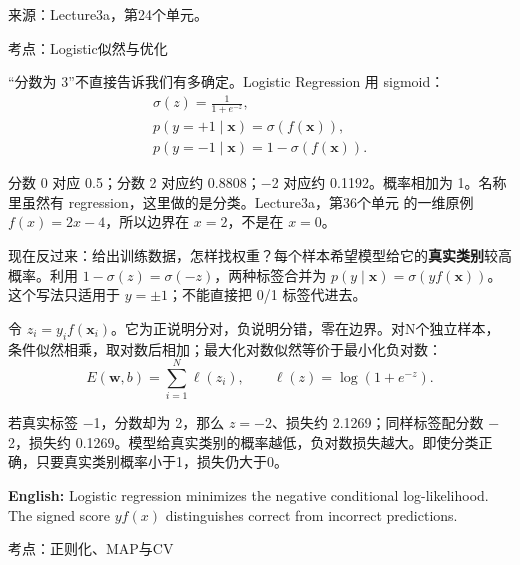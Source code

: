 来源：Lecture3a，第24个单元。








考点：Logistic似然与优化

“分数为 3”不直接告诉我们有多确定。Logistic Regression 用 sigmoid：
\[
\begin{gathered}\sigma(z)=\frac1{1+e^{-z}},\\[3pt]
p(y=+1\mid\mathbf x)=\sigma(f(\mathbf x)),\\
p(y=-1\mid\mathbf x)=1-\sigma(f(\mathbf x)).\end{gathered}\tag{3.2}
\]


分数 0 对应 0.5；分数 2 对应约 0.8808；\ensuremath{-}2 对应约 0.1192。概率相加为 1。名称里虽然有 regression，这里做的是分类。Lecture3a，第36个单元 的一维原例 \(f(x)=2x-4\)，所以边界在 \(x=2\)，不是在 \(x=0\)。


现在反过来：给出训练数据，怎样找权重？每个样本希望模型给它的\textbf{真实类别}较高概率。利用 \(1-\sigma(z)=\sigma(-z)\)，两种标签合并为 \(p(y\mid\mathbf x)=\sigma(yf(\mathbf x))\)。这个写法只适用于 \(y=\pm1\)；不能直接把 0/1 标签代进去。


令 \(z_i=y_i f(\mathbf x_i)\)。它为正说明分对，负说明分错，零在边界。对N个独立样本，条件似然相乘，取对数后相加；最大化对数似然等价于最小化负对数：
\[
E(\mathbf w,b)=\sum_{i=1}^N\ell(z_i),\qquad \ell(z)=\log(1+e^{-z}).\tag{3.3}
\]


若真实标签 \ensuremath{-}1，分数却为 2，那么 \(z=-2\)、损失约 2.1269；同样标签配分数 \ensuremath{-}2，损失约 0.1269。模型给真实类别的概率越低，负对数损失越大。即使分类正确，只要真实类别概率小于1，损失仍大于0。


\textbf{English:} Logistic regression minimizes the negative conditional log-likelihood. The signed score \(yf(x)\) distinguishes correct from incorrect predictions.








考点：正则化、MAP与CV

